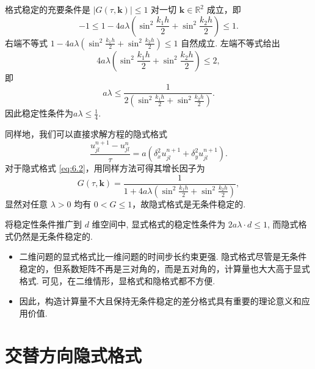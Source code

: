 格式稳定的充要条件是 $|G(\tau, \boldsymbol{k})| \leq 1$ 对一切 $\boldsymbol{k} \in \mathbb{R}^2$ 成立，即
\begin{equation*}
    -1 \leq 1 - 4a\lambda\left(\sin^2 \frac{k_1 h}{2} + \sin^2 \frac{k_2 h}{2}\right) \leq 1.
\end{equation*}
右端不等式 $1 - 4a\lambda(\sin^2 \frac{k_1 h}{2} + \sin^2 \frac{k_2 h}{2}) \leq 1$ 自然成立. 左端不等式给出
\begin{equation*}
    4a\lambda\left(\sin^2 \frac{k_1 h}{2} + \sin^2 \frac{k_2 h}{2}\right) \leq 2,
\end{equation*}
即
\begin{equation*}
    a\lambda \leq \frac{1}{2\left(\sin^2 \frac{k_1 h}{2} + \sin^2 \frac{k_2 h}{2}\right)}.
\end{equation*}
因此稳定性条件为$a\lambda \leq \frac{1}{4}.$\par
同样地，我们可以直接求解方程的隐式格式\begin{equation}\label{eq:6.2}
    \frac{u_{jl}^{n+1} - u_{jl}^n}{\tau} = a\left(\delta_x^2 u_{jl}^{n+1} + \delta_y^2 u_{jl}^{n+1}\right).
\end{equation}
对于隐式格式 \eqref{eq:6.2}，用同样方法可得其增长因子为
\begin{equation*}
    G(\tau, \boldsymbol{k}) = \frac{1}{1 + 4a\lambda\left(\sin^2 \frac{k_1 h}{2} + \sin^2 \frac{k_2 h}{2}\right)},
\end{equation*}
显然对任意 $\lambda > 0$ 均有 $0 < G \leq 1$，故隐式格式是无条件稳定的.\par
将稳定性条件推广到 $d$ 维空间中, 显式格式的稳定性条件为 $2a\lambda\cdot d \leq 1$, 而隐式格式仍然是无条件稳定的.



\begin{remark}[困难]
\begin{itemize}
    \item 二维问题的显式格式比一维问题的时间步长约束更强. 隐式格式尽管是无条件稳定的，但系数矩阵不再是三对角的，而是五对角的，计算量也大大高于显式格式. 可见，在二维情形，显格式和隐格式都不方便.
    \item 因此，构造计算量不大且保持无条件稳定的差分格式具有重要的理论意义和应用价值.
\end{itemize}
\end{remark}

\section{交替方向隐式格式}

